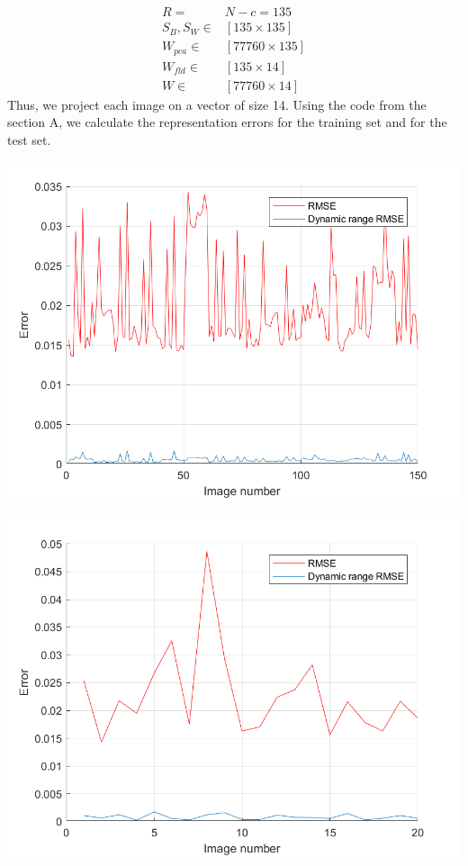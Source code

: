\documentclass[a4paper]{iacas}
\begin{document}
\begin{align*}
R =& N - c = 135 \\
S_{B}, S_{W} \in& [135 \times 135] \\
W_{pca} \in&  [77760 \times 135] \\
W_{fld} \in&  [135 \times 14] \\
W \in& [77760 \times 14] 
\end{align*}
Thus, we project each image on a vector of size 14. 
Using the code from the section A, we calculate the representation errors for the training set and for the test set.
\newline

\vskip 0.1in
\begin{minipage}{\linewidth}
	\centering
	\includegraphics[scale=0.9]{imgs2/rmse_train.png}
	\label{fig_1}
\end{minipage}
\vskip 0.1in
\begin{minipage}{\linewidth}
	\centering
	\includegraphics[scale=0.9]{imgs2/rmse_test.png}
	\label{fig_1}
\end{minipage}
\vskip 0.1in
\end{document}
